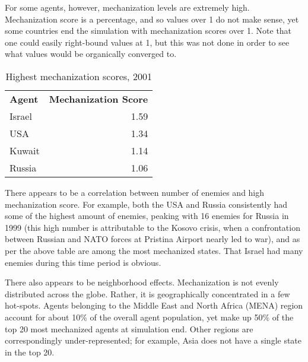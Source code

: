 \documentclass{article}
\begin{document}
For some agents, however, mechanization levels are extremely high. 
Mechanization score is a percentage, and so values over 1 do not make sense, 
yet some countries end the simulation with mechanization scores over 1. Note
that one could easily right-bound values at 1, but this was not done in order to
see what values would be organically converged to.

\begin{table}[h]
	\centering
	\caption{Highest mechanization scores, 2001}
	\begin{tabular}{|l r|}
		\hline
		\textbf{Agent} & \textbf{Mechanization Score} \\
		Israel & 1.59 \\
		USA & 1.34 \\
		Kuwait & 1.14 \\
		Russia & 1.06 \\
		\hline
	\end{tabular}
\end{table}

There appears to be a correlation between number of enemies and high
mechanization score. For example, both the USA and Russia consistently had some
of the highest amount of enemies, peaking with 16 enemies for Russia in 1999
(this high number is attributable to the Kosovo crisis, when a confrontation between Russian and NATO forces
at Pristina Airport nearly led to war), and as per the above table are among the
most mechanized states. That Israel had many enemies during this time period is
obvious. 

There also appears to be neighborhood effects. Mechanization is not evenly
distributed across the globe. Rather, it is geographically concentrated in a few
hot-spots. Agents belonging to the Middle East and North Africa (MENA) region
account for about 10\% of the overall agent population, yet make up 50\% of the
top 20 most mechanized agents at simulation end. Other regions
are correspondingly under-represented; for example, Asia does not have a single
state in the top 20.
\end{document}
